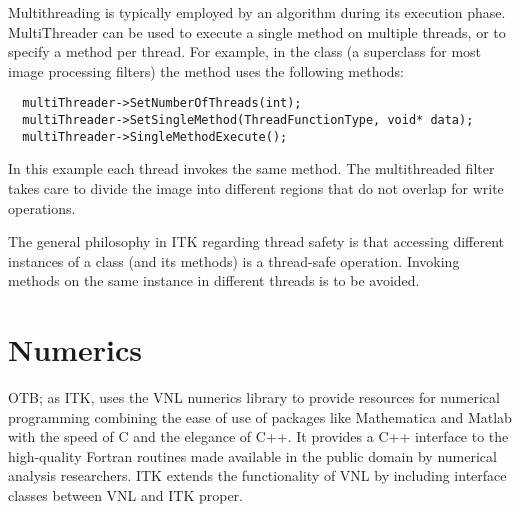 Multithreading is typically employed by an algorithm during its execution
phase. MultiThreader can be used to execute a single method on
multiple threads, or to specify a method per thread. For example, in the 
class  (a superclass for most image processing filters)
the  method uses the following methods:

\small
\begin{verbatim}
  multiThreader->SetNumberOfThreads(int);
  multiThreader->SetSingleMethod(ThreadFunctionType, void* data);
  multiThreader->SingleMethodExecute();
\end{verbatim}
\normalsize

In this example each thread invokes the same method. The multithreaded filter
takes care to divide the image into different regions that do not overlap for
write operations.

The general philosophy in ITK regarding thread safety is that accessing
different instances of a class (and its methods) is a thread-safe operation.
Invoking methods on the same instance in different threads is to be avoided.


\section{Numerics}
\label{sec:Numerics}


OTB; as ITK, uses the VNL numerics library to provide resources for numerical
programming combining the ease of use of packages like Mathematica and Matlab
with the speed of C and the elegance of C++. It provides a C++ interface to
the high-quality Fortran routines made available in the public domain by
numerical analysis researchers. ITK extends the functionality of VNL
by including interface classes between VNL and ITK proper.

